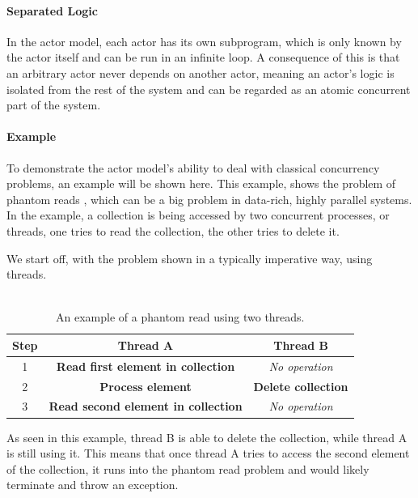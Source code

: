 \paragraph{Separated Logic}
In the actor model, each actor has its own subprogram, which is only known by the actor itself and can be run in an infinite loop. A consequence of this is that an arbitrary actor never depends on another actor, meaning an actor's logic is isolated from the rest of the system and can be regarded as an atomic concurrent part of the system.

\paragraph{Example}
To demonstrate the actor model's ability to deal with classical concurrency problems, an example will be shown here. This example, shows the problem of phantom reads , which can be a big problem in data-rich, highly parallel systems. In the example, a collection is being accessed by two concurrent processes, or threads, one tries to read the collection, the other tries to delete it.

We start off, with the problem shown in a typically imperative way, using threads.\\\\
%
\begin{table}
\begin{tabular}{ | c | c | c | }
\hline
Step & Thread A & Thread B \\\hline
1 & \textbf{Read first element in collection} & \textit{No operation} \\\hline
2 & \textbf{Process element} & \textbf{Delete collection}\\\hline
3 & \textbf{\color{red} Read second element in collection} & \textit{No operation}\\\hline
\end{tabular}
\caption{An example of a phantom read using two threads.}
\end{table}

As seen in this example, thread B is able to delete the collection, while thread A is still using it. This means that once thread A tries to access the second element of the collection, it runs into the phantom read problem and would likely terminate and throw an exception.

